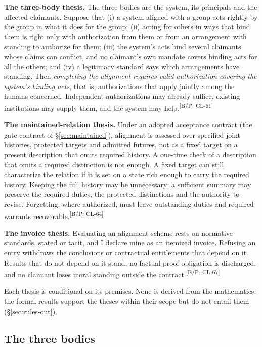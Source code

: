 \documentclass[pdflatex,sn-basic]{sn-jnl}%
\newcommand{\claim}[2]{\ifannotated\textsuperscript{\textcolor{blue!60!black}{\tiny[#1: #2]}}\fi}
\begin{document}
\begin{theses}
  \item \textbf{The three-body thesis.} The three bodies are the system, its principals and the affected claimants. Suppose that (i) a system aligned with a group acts rightly by the group in what it does for the group; (ii) acting for others in ways that bind them is right only with authorization from them or from an arrangement with standing to authorize for them; (iii) the system's acts bind several claimants whose claims can conflict, and no claimant's own mandate covers binding acts for all the others; and (iv) a legitimacy standard says which arrangements have standing. Then \emph{completing the alignment requires valid authorization covering the system's binding acts}, that is, authorizations that apply jointly among the humans concerned. Independent authorizations may already suffice, existing institutions may supply them, and the system may help.\claim{B/P}{CL-61}
  \item \textbf{The maintained-relation thesis.} Under an adopted acceptance contract (the gate contract of \S\ref{sec:maintained}), alignment is assessed over specified joint histories, protected targets and admitted futures, not as a fixed target on a present description that omits required history. A one-time check of a description that omits a required distinction is not enough. A fixed target can still characterize the relation if it is set on a state rich enough to carry the required history. Keeping the full history may be unnecessary: a sufficient summary may preserve the required duties, the protected distinctions and the authority to revise. Forgetting, where authorized, must leave outstanding duties and required warrants recoverable.\claim{B/P}{CL-64}
  \item \textbf{The invoice thesis.} Evaluating an alignment scheme rests on normative standards, stated or tacit, and I declare mine as an itemized invoice. Refusing an entry withdraws the conclusions or contractual entitlements that depend on it. Results that do not depend on it stand, no factual proof obligation is discharged, and no claimant loses moral standing outside the contract.\claim{B/P}{CL-67}
\end{theses}

Each thesis is conditional on its premises. None is derived from the mathematics: the formal results support the theses within their scope but do not entail them (\S\ref{sec:rules-out}).

\subsection{The three bodies}\label{sec:bodies}
\end{document}
